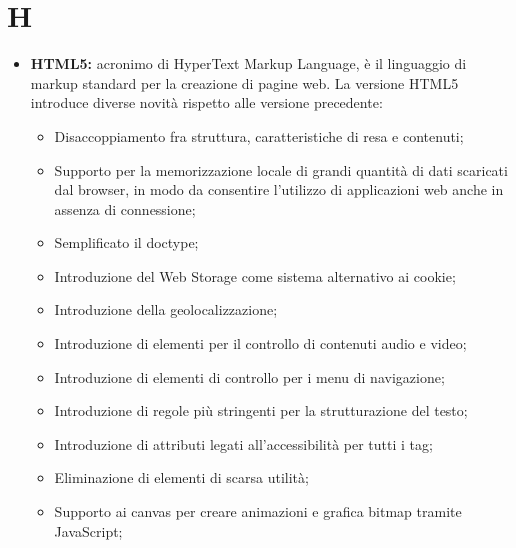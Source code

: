\section*{H} %
\label{sec:h}
	\begin{itemize}
		\item \textbf{HTML5:} acronimo di HyperText Markup Language, è il linguaggio di markup standard per la creazione di pagine web. La versione HTML5 introduce diverse novità rispetto alle versione precedente:
		 \begin{itemize}
		 	\item Disaccoppiamento fra struttura, caratteristiche di resa e contenuti;
		 	\item Supporto per la memorizzazione locale di grandi quantità di dati scaricati dal browser, in modo da consentire l'utilizzo di applicazioni web anche in assenza di connessione;
		 	\item Semplificato il doctype;
		 	\item Introduzione del Web Storage come sistema alternativo ai cookie;
		 	\item Introduzione della geolocalizzazione;
			\item Introduzione di elementi per il controllo di contenuti audio e video;
			\item Introduzione di elementi di controllo per i menu di navigazione;
			\item Introduzione di regole più stringenti per la strutturazione del testo;
			\item Introduzione di attributi legati all'accessibilità per tutti i tag;
			\item Eliminazione di elementi di scarsa utilità;
			\item Supporto ai canvas per creare animazioni e grafica bitmap tramite JavaScript;
		 \end{itemize}
	\end{itemize}
\pagebreak

